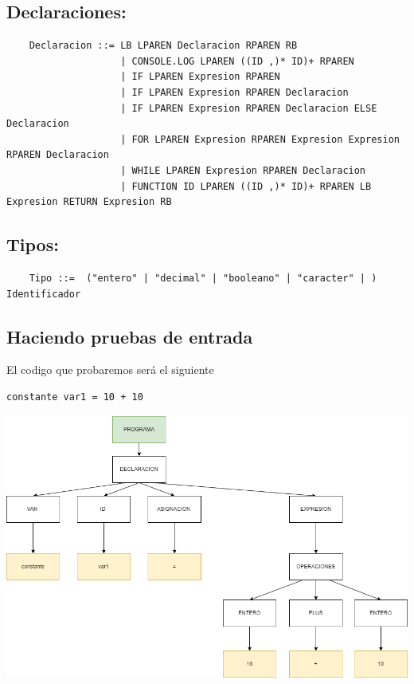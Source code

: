 \subsection{Declaraciones:}
\begin{verbatim}
    Declaracion	::=	LB LPAREN Declaracion RPAREN RB
                    | CONSOLE.LOG LPAREN ((ID ,)* ID)+ RPAREN 
            	    | IF LPAREN Expresion RPAREN
            	    | IF LPAREN Expresion RPAREN Declaracion
            	    | IF LPAREN Expresion RPAREN Declaracion ELSE Declaracion
            	    | FOR LPAREN Expresion RPAREN Expresion Expresion RPAREN Declaracion
            	    | WHILE LPAREN Expresion RPAREN Declaracion
            	    | FUNCTION ID LPAREN ((ID ,)* ID)+ RPAREN LB Expresion RETURN Expresion RB
\end{verbatim}

\subsection{Tipos:}

\begin{verbatim}
    Tipo ::=  ("entero" | "decimal" | "booleano" | "caracter" | ) Identificador
\end{verbatim}

\subsection{Haciendo pruebas de entrada}
El codigo que probaremos será el siguiente
\begin{verbatim}
constante var1 = 10 + 10
\end{verbatim}
\includegraphics[width=15cm]{images/arbol.png}


